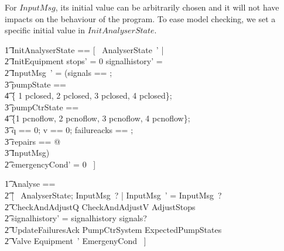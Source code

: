 \documentclass{report} %
\begin{document}
For $InputMsg$, its initial value can be arbitrarily chosen and it will not have impacts on the behaviour of the program. To ease model checking, we set a specific initial value in $InitAnalyserState$.
\begin{zed}
    \t1 InitAnalyserState == [~ AnalyserState~' | \\
        \t2 InitEquipment \land stops' = 0 \land signalhistory' = \emptyset \land \\
        \t2 \theta InputMsg~' = (\LET signals == \emptyset[InputSignal]; \\
            \t3 pumpState == \\
                \t4 \{ 1 \mapsto pclosed, 2 \mapsto pclosed, 3 \mapsto pclosed, 4 \mapsto pclosed\}; \\
            \t3 pumpCtrState == \\
                \t4 \{1 \mapsto pcnoflow, 2 \mapsto pcnoflow, 3 \mapsto pcnoflow, 4 \mapsto pcnoflow\}; \\
            \t3 q == 0; v == 0; failureacks == \emptyset[UnitFailure]; \\
            \t3 repairs == \emptyset[UnitFailure] @ \\
            \t3 \theta InputMsg) \\
        \t2 \land emergencyCond' = 0 ~] \\
\end{zed}
\begin{zed}
    \t1 Analyse == \\
        \t2 [~ \Delta AnalyserState; InputMsg~? | \theta InputMsg~' = \theta InputMsg~? \land \\
        \t2 CheckAndAdjustQ \land CheckAndAdjustV \land AdjustStops \land \\
        \t2 signalhistory' = signalhistory \cup signals? \land \\
        \t2 UpdateFailuresAck \land 
        \Xi PumpCtrSystem \land \Xi ExpectedPumpStates \land \\ %
        \t2 \Xi Valve \land Equipment~' \land \Xi EmergenyCond ~] \\
\end{zed}
\end{document}
